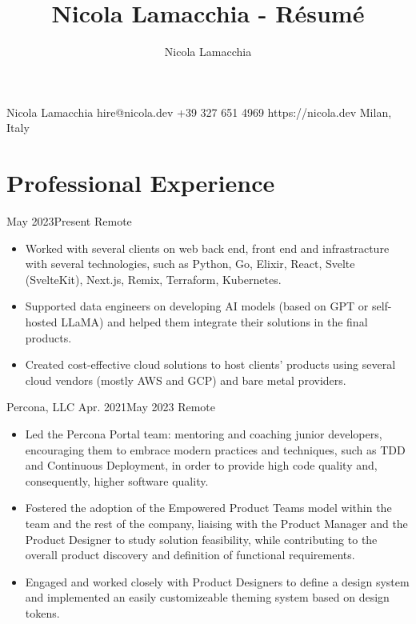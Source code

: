 \documentclass{resume}
\title{Nicola Lamacchia - Résumé}
\author{Nicola Lamacchia}
\begin{document}
\heading%
    {Nicola}
    {Lamacchia}
    {}
    {hire@nicola.dev}%
    {+39 327 651 4969}%
    {https://nicola.dev}
    {Milan, Italy}

\separator[cvlightgray]


\section{Professional Experience}

\begin{cvsection}
        {}%
        {May 2023}{Present}%
        {Remote}%
        {%
            \begin{itemize}
                \item Worked with several clients on web back end, front end
                    and infrastracture with several technologies, such as
                    Python, Go, Elixir, React, Svelte (SvelteKit), Next.js,
                    Remix, Terraform, Kubernetes.
                \item Supported data engineers on developing AI models (based
                    on GPT or self-hosted LLaMA) and helped them integrate
                    their solutions in the final products.
                \item Created cost-effective cloud solutions to host clients'
                    products using several cloud vendors (mostly AWS and GCP)
                    and bare metal providers.
            \end{itemize}
        }

        {Percona, LLC}%
        {Apr. 2021}{May 2023}%
        {Remote}%
        {%
            \begin{itemize}
                \item Led the Percona Portal team: mentoring and coaching
                    junior developers, encouraging them to embrace modern
                    practices and techniques, such as TDD and Continuous
                    Deployment, in order to provide high code quality and,
                    consequently, higher software quality.
                \item Fostered the adoption of the Empowered Product Teams
                    model within the team and the rest of the company, liaising
                    with the Product Manager and the Product Designer to
                    study solution feasibility, while contributing to the
                    overall product discovery and definition of functional
                    requirements.
                \item Engaged and worked closely with Product Designers to
                    define a design system and implemented an easily
                    customizeable theming system based on design tokens.
            \end{itemize}
        }


\end{cvsection}
\end{document}
